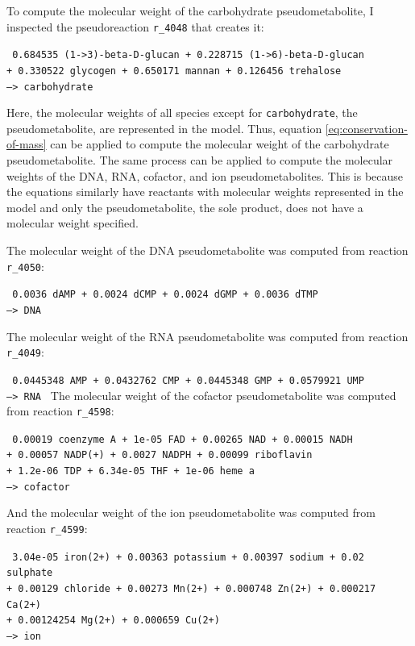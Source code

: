To compute the molecular weight of the carbohydrate pseudometabolite, I inspected the pseudoreaction \texttt{r\_4048} that creates it:

\texttt{
  0.684535 (1->3)-beta-D-glucan + 0.228715 (1->6)-beta-D-glucan \\
  + 0.330522 glycogen + 0.650171 mannan + 0.126456 trehalose \\
  --> carbohydrate
}

Here, the molecular weights of all species except for \texttt{carbohydrate}, the pseudometabolite, are represented in the model.
Thus, equation \ref{eq:conservation-of-mass} can be applied to compute the molecular weight of the carbohydrate pseudometabolite.
The same process can be applied to compute the molecular weights of the DNA, RNA, cofactor, and ion pseudometabolites.
This is because the equations similarly have reactants with molecular weights represented in the model and only the pseudometabolite, the sole product, does not have a molecular weight specified.

The molecular weight of the DNA pseudometabolite was computed from reaction \texttt{r\_4050}:

\texttt{
  0.0036 dAMP + 0.0024 dCMP + 0.0024 dGMP + 0.0036 dTMP \\
  --> DNA
}

The molecular weight of the RNA pseudometabolite was computed from reaction \texttt{r\_4049}:

\texttt{
  0.0445348 AMP + 0.0432762 CMP + 0.0445348 GMP + 0.0579921 UMP \\
  --> RNA
}
The molecular weight of the cofactor pseudometabolite was computed from reaction \texttt{r\_4598}:

\texttt{
  0.00019 coenzyme A + 1e-05 FAD + 0.00265 NAD + 0.00015 NADH \\
  + 0.00057 NADP(+) + 0.0027 NADPH + 0.00099 riboflavin \\
  + 1.2e-06 TDP + 6.34e-05 THF + 1e-06 heme a \\
  --> cofactor
}

And the molecular weight of the ion pseudometabolite was computed from reaction \texttt{r\_4599}:

\texttt{
  3.04e-05 iron(2+) + 0.00363 potassium + 0.00397 sodium + 0.02 sulphate \\
  + 0.00129 chloride + 0.00273 Mn(2+) + 0.000748 Zn(2+) + 0.000217 Ca(2+) \\
  + 0.00124254 Mg(2+) + 0.000659 Cu(2+) \\
  --> ion
}

